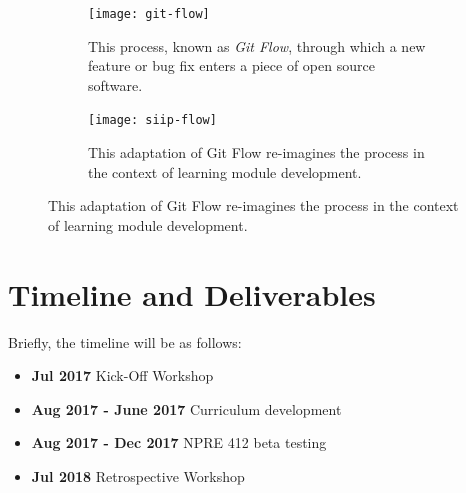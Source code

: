 \documentclass[11pt]{article}
\begin{document}
          \begin{figure}
                  \centering
                  \begin{subfigure}{.4\textwidth}
                            \centering
                            \texttt{[image: git-flow]}
          \caption{This process, known as \emph{Git Flow}, through which a new 
                          feature or bug fix enters a piece of open source 
                          software\cite{scopatz_effective_2015}.}
                                  \label{fig:sub1}
                  \end{subfigure}\hfill%
                  \begin{subfigure}{.4\textwidth}
                            \centering
                            \texttt{[image: siip-flow]}
          \caption{This adaptation of Git Flow re-imagines the process in the context of learning module development.}
                                  \label{fig:sub2}
                  \end{subfigure}
                  \label{fig:test}
          \end{figure}
          \FloatBarrier

          \section{Timeline and Deliverables}
          Briefly, the timeline will be as follows:

          \begin{itemize}
                  \item \textbf{Jul 2017} Kick-Off Workshop
                  \item \textbf{Aug 2017 - June 2017} Curriculum development
                  \item \textbf{Aug 2017 - Dec 2017} NPRE 412 beta testing
                  \item \textbf{Jul 2018} Retrospective Workshop
          \end{itemize}
\end{document}
